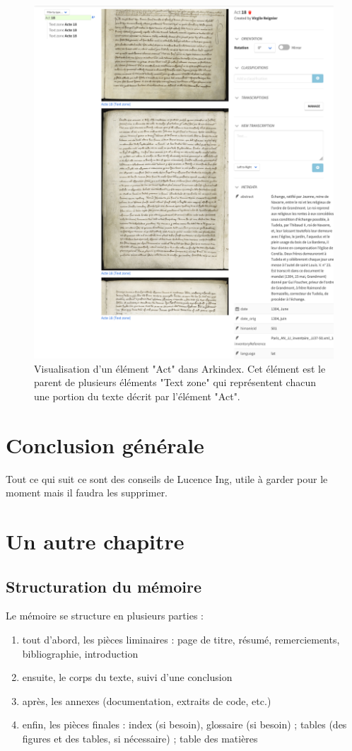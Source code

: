 \documentclass[a4paper,12pt,twoside]{book}
\begin{document}
	\begin{figure}
		\centering
		\includegraphics[width=12cm]{Images/Act_on_Arkindex.png}
		\caption{Visualisation d'un élément "Act" dans Arkindex. Cet élément est le parent de plusieurs éléments "Text zone" qui représentent chacun une portion du texte décrit par l'élément "Act".}
		\label{Act_on_Arkindex}
	\end{figure}
	
	\chapter*{Conclusion générale}
	
	Tout ce qui suit ce sont des conseils de Lucence Ing, utile à garder pour le moment mais il faudra les supprimer.
	
	\chapter{Un autre chapitre}
	
	\section{Structuration du mémoire}
	
	Le mémoire se structure en plusieurs parties :
	\begin{enumerate}
		\item tout d'abord, les pièces liminaires : page de titre, résumé, remerciements, bibliographie, introduction
		\item ensuite, le corps du texte, suivi d'une conclusion
		\item après, les annexes (documentation, extraits de code, etc.)
		\item enfin, les pièces finales : index (si besoin), glossaire (si besoin) ; tables (des figures et des tables, si nécessaire) ; table des matières
	\end{enumerate}
	
\end{document}
